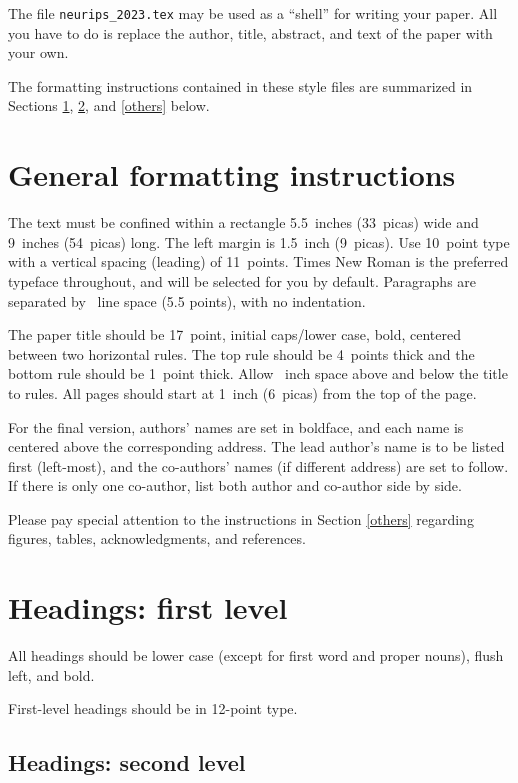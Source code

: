 \documentclass{article}
\begin{document}
The file \verb+neurips_2023.tex+ may be used as a ``shell'' for writing your
paper. All you have to do is replace the author, title, abstract, and text of
the paper with your own.


The formatting instructions contained in these style files are summarized in
Sections \ref{gen_inst}, \ref{headings}, and \ref{others} below.


\section{General formatting instructions}
\label{gen_inst}


The text must be confined within a rectangle 5.5~inches (33~picas) wide and
9~inches (54~picas) long. The left margin is 1.5~inch (9~picas).  Use 10~point
type with a vertical spacing (leading) of 11~points.  Times New Roman is the
preferred typeface throughout, and will be selected for you by default.
Paragraphs are separated by ~line space (5.5 points), with no
indentation.


The paper title should be 17~point, initial caps/lower case, bold, centered
between two horizontal rules. The top rule should be 4~points thick and the
bottom rule should be 1~point thick. Allow ~inch space above and
below the title to rules. All pages should start at 1~inch (6~picas) from the
top of the page.


For the final version, authors' names are set in boldface, and each name is
centered above the corresponding address. The lead author's name is to be listed
first (left-most), and the co-authors' names (if different address) are set to
follow. If there is only one co-author, list both author and co-author side by
side.


Please pay special attention to the instructions in Section \ref{others}
regarding figures, tables, acknowledgments, and references.


\section{Headings: first level}
\label{headings}


All headings should be lower case (except for first word and proper nouns),
flush left, and bold.


First-level headings should be in 12-point type.


\subsection{Headings: second level}
\end{document}
